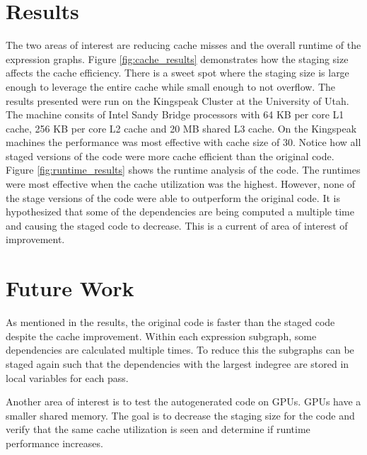 \documentclass[10pt, conference]{IEEEtran} %
\begin{document}
\section{Results}
The two areas of interest are reducing cache misses and the overall runtime of the expression graphs. Figure \ref{fig:cache_results} demonstrates how the staging size affects the cache efficiency. There is a sweet spot where the staging size is large enough to leverage the entire cache while small enough to not overflow. The results presented were run on the Kingspeak Cluster at the University of Utah. The machine consits of Intel Sandy Bridge processors with 64 KB per core L1 cache, 256 KB per core L2 cache and 20 MB shared L3 cache. On the Kingspeak machines the performance was most effective with cache size of 30. Notice how all staged versions of the code were more cache efficient than the original code. 
Figure \ref{fig:runtime_results} shows the runtime analysis of the code. The runtimes were most effective when the cache utilization was the highest. However, none of the stage versions of the code were able to outperform the original code. It is hypothesized that some of the dependencies are being computed a multiple time and causing the staged code to decrease. This is a current of area of interest of improvement.


\section{Future Work}
As mentioned in the results, the original code is faster than the staged code despite the cache improvement. Within each expression subgraph, some dependencies are calculated multiple times. To reduce this the subgraphs can be staged again such that the dependencies with the largest indegree are stored in local variables for each pass.

Another area of interest is to test the autogenerated code on GPUs. GPUs have a smaller shared memory. The goal is to decrease the staging size for the code and verify that the same cache utilization is seen and determine if runtime performance increases.







\end{document}

